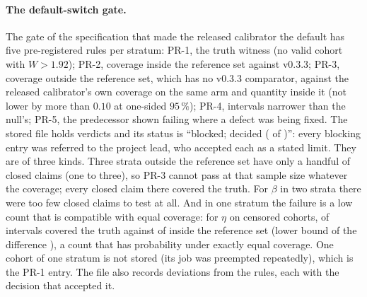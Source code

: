 \paragraph{The default-switch gate.} The gate of the specification that made the released calibrator the default has five
pre-registered rules per stratum: PR-1, the truth witness (no valid cohort with $W>1.92$); PR-2, coverage inside the
reference set against v0.3.3; PR-3, coverage outside the reference set, which has no v0.3.3 comparator, against the released
calibrator's own coverage on the same arm and quantity inside it (not lower by more than $0.10$ at one-sided $95\,\%$); PR-4,
intervals narrower than the null's; PR-5, the predecessor shown failing where a defect was being fixed. The stored file
holds  verdicts and its status is ``blocked; decided ( of )'': every blocking entry was
referred to the project lead, who accepted each as a stated limit. They are of three kinds. Three strata outside the reference set have only
a handful of closed claims (one to three), so PR-3 cannot pass at that sample size whatever the coverage; every closed claim there covered the
truth. For $\beta$ in two strata there were too few closed claims to test at all. And in one stratum the failure is a low count that is
compatible with equal coverage: for $\eta$ on censored cohorts,  of  intervals covered the truth
against  of  inside the reference set (lower bound of the difference
), a count that has probability  under exactly equal coverage. One cohort of one stratum is not stored
(its job was preempted repeatedly), which is the PR-1 entry. The file also records  deviations from the rules, each with the
decision that accepted it.
